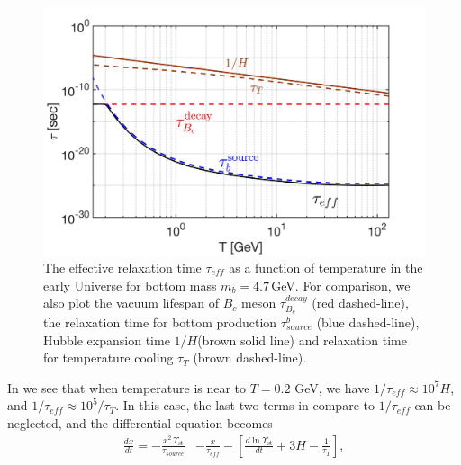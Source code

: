 \begin{figure} 
\centerline{\includegraphics[width=0.9\linewidth]{./plots/Tau_RelaxationTime002}}
\caption{The effective relaxation time $\tau_{eff}$ as a function of temperature in the early Universe for bottom mass $m_b=4.7$\,GeV.  For comparison, we also plot the vacuum lifespan of $B_c$ meson $\tau_{B_c}^{decay}$ (red dashed-line), the relaxation time for bottom production $\tau^b_{source}$ (blue dashed-line), Hubble expansion time $1/H$(brown solid line) and relaxation time for temperature cooling $\tau_T$ (brown dashed-line). }
\label{RelaxationTime_eff}
\end{figure}

In  we see that when temperature is near to $T=0.2$ GeV, we have $1/\tau_{eff}\approx10^{7}H$, and $1/\tau_{eff}\approx10^5/\tau_T$. In this case, the last two terms in  compare to $1/\tau_{eff}$ can be neglected, and the differential equation becomes
\begin{align}\label{nonstationary_eq}
\frac{dx}{dt}=-\frac{x^2\,\Upsilon_\mathrm{st}}{\tau_{source}}&-\frac{x}{\tau_{eff}}-\left[\frac{d\ln\Upsilon_\mathrm{st}}{dt}+3H-\frac{1}{\tau_T}\right],
\end{align}


